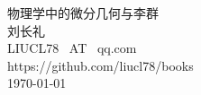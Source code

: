
\begin{titlepage}
    
\vspace*{10mm}
\begin{center}
    
  {\heiti\Huge{物理学中的微分几何与李群}} \\ [10mm]
  {\large {刘长礼} }\\ [10mm]
  {\large{LIUCL78 {\ AT\ } qq.com }} \\ [10mm]
  
  {\large{https://github.com/liucl78/books }} \\ [10mm]
  
  {\large {\today}} \\ [10mm]
  

\end{center}

\end{titlepage}

\thispagestyle{empty}

\endinput 